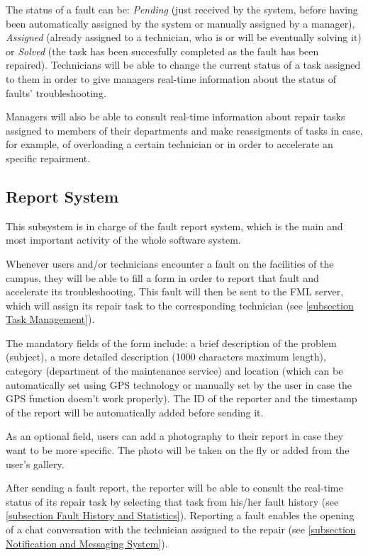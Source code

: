 The status of a fault can be: \emph{Pending} (just received by the system, before having been automatically assigned by the system or manually assigned by a manager), \emph{Assigned} (already assigned to a technician, who is or will be eventually solving it) or \emph{Solved} (the task has been succesfully completed as the fault has been repaired). Technicians will be able to change the current status of a task assigned to them in order to give managers real-time information about the status of faults' troubleshooting.

Managers will also be able to consult real-time information about repair tasks assigned to members of their departments and make reassigments of tasks in case, for example, of overloading a certain technician or in order to accelerate an specific repairment.

\subsection{Report System}
\label{subsection Report System}

This subsystem is in charge of the fault report system, which is the main and most important activity of the whole software system.

Whenever users and/or technicians encounter a fault on the facilities of the campus, they will be able to fill a form in order to report that fault and accelerate its troubleshooting. This fault will then be sent to the FML server, which will assign its repair task to the corresponding technician (see \ref{subsection Task Management}).

The mandatory fields of the form include: a brief description of the problem (subject), a more detailed description (1000 characters maximum length), category (department of the maintenance service) and location (which can be automatically set using GPS technology or manually set by the user in case the GPS function doesn't work properly). The ID of the reporter and the timestamp of the report will be automatically added before sending it. 

As an optional field, users can add a photography to their report in case they want to be more specific. The photo will be taken on the fly or added from the user's gallery.

After sending a fault report, the reporter will be able to consult the real-time status of its repair task by selecting that task from his/her fault history (see \ref{subsection Fault History and Statistics}). Reporting a fault enables the opening of a chat conversation with the technician assigned to the repair (see \ref{subsection Notification and Messaging System}).

